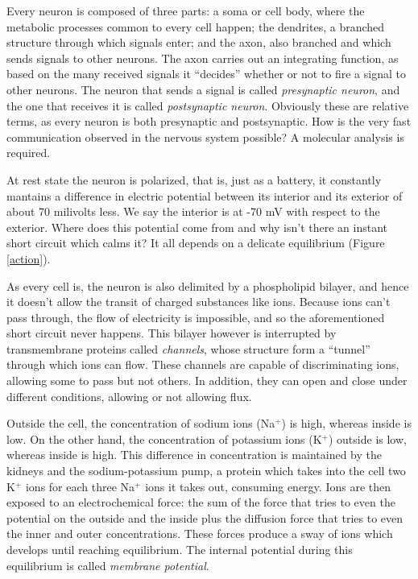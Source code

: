 Every neuron is composed of three parts: a soma or cell body, where the metabolic processes common to every cell happen; the dendrites, a branched structure through which signals enter; and the axon, also branched and which sends signals to other neurons. The axon carries out an integrating function, as based on the many received signals it \enquote{decides} whether or not to fire a signal to other neurons. The neuron that sends a signal is called \textit{presynaptic neuron}, and the one that receives it is called \textit{postsynaptic neuron}. Obviously these are relative terms, as every neuron is both presynaptic and postsynaptic. How is the very fast communication observed in the nervous system possible? A molecular analysis is required.

At rest state the neuron is polarized, that is, just as a battery, it constantly mantains a difference in electric potential between its interior and its exterior of about 70 milivolts less. We say the interior is at -70 mV with respect to the exterior. Where does this potential come from and why isn't there an instant short circuit which calms it? It all depends on a delicate equilibrium (Figure \ref{action}).

As every cell is, the neuron is also delimited by a phospholipid bilayer, and hence it doesn't allow the transit of charged substances like ions. Because ions can't pass through, the flow of electricity is impossible, and so the aforementioned short circuit never happens. This bilayer however is interrupted by transmembrane proteins called \textit{channels}, whose structure form a \enquote{tunnel} through which ions can flow. These channels are capable of discriminating ions, allowing some to pass but not others. In addition, they can open and close under different conditions, allowing or not allowing flux.

Outside the cell, the concentration of sodium ions (Na$^+$) is high, whereas inside is low. On the other hand, the concentration of potassium ions (K$^+$) outside is low, whereas inside is high. This difference in concentration is maintained by the kidneys and the sodium-potassium pump, a protein which takes into the cell two K$^+$ ions for each three Na$^+$ ions it takes out, consuming energy. Ions are then exposed to an electrochemical force: the sum of the force that tries to even the potential on the outside and the inside plus the diffusion force that tries to even the inner and outer concentrations. These forces produce a sway of ions which develops until reaching equilibrium. The internal potential during this equilibrium is called \textit{membrane potential}.

